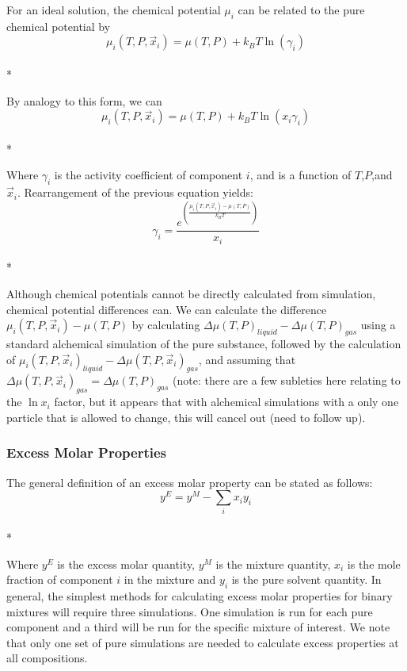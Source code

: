 \documentclass[a4paper,12pt]{article}
\begin{document}
For an ideal solution, the chemical potential $\mu_i$ can be related to the pure chemical potential by 
\begin{equation}\mu_{i}(T,P,\vec{x}_i) = \mu(T,P) + k_B T \ln\left(\gamma_i\right)\end{equation}\\*

By analogy to this form, we can 
\begin{equation}\mu_{i}(T,P,\vec{x}_i) = \mu(T,P) + k_B T \ln\left(x_i \gamma_i\right)\end{equation}\\*

Where $\gamma_i$ is the activity coefficient of component $i$, and is
a function of $T$,$P$,and $\vec{x}_i$.  Rearrangement of the previous
equation yields:
\begin{equation}\gamma_i = \frac{e^{\left(\frac{\mu_i(T,P,\vec{x}_i) - \mu(T,P)}{k_B T}\right)}}{x_i}\end{equation}\\*

Although chemical potentials cannot be directly calculated from
simulation, chemical potential differences can. We can calculate the
difference $\mu_i(T,P,\vec{x}_i) - \mu(T,P)$ by calculating $\Delta
\mu(T,P)_{liquid} - \Delta \mu(T,P)_{gas}$ using a standard alchemical
simulation of the pure substance, followed by the calculation of
$\mu_i(T,P,\vec{x}_i)_{liquid} - \Delta \mu(T,P,\vec{x}_i)_{gas}$, and
assuming that $\Delta \mu(T,P,\vec{x}_i)_{gas} = \Delta
\mu(T,P)_{gas}$ (note: there are a few subleties here relating to the
$\ln x_i$ factor, but it appears that with alchemical simulations with
a only one particle that is allowed to change, this will cancel out
(need to follow up).


\subsubsection{Excess Molar Properties}
 The general definition of an excess molar property can be stated as follows:
\begin{equation}y^{E} = y^{M} - \sum_{i} x_i y_i\end{equation}\\*

 Where $y^E$ is the excess molar quantity, $y^M$ is the mixture quantity, $x_i$ is the mole fraction of component $i$ in the mixture and $y_i$ is the pure solvent quantity. In general, the simplest methods for calculating excess molar properties for binary mixtures will require three simulations. One simulation is run for each pure component and a third will be run for the specific mixture of interest.
We note that only one set of pure simulations are needed to calculate excess properties at all compositions.
\end{document}
